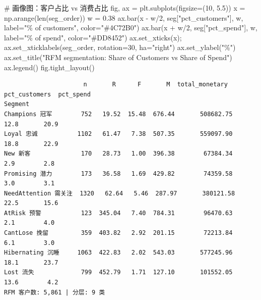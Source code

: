 \documentclass[
]{ctexart}
\newenvironment{Shaded}{\begin{snugshade}}{\end{snugshade}}
\newcommand{\BuiltInTok}[1]{\textcolor[rgb]{0.00,0.23,0.31}{#1}}
\newcommand{\CommentTok}[1]{\textcolor[rgb]{0.37,0.37,0.37}{#1}}
\newcommand{\DecValTok}[1]{\textcolor[rgb]{0.68,0.00,0.00}{#1}}
\newcommand{\FloatTok}[1]{\textcolor[rgb]{0.68,0.00,0.00}{#1}}
\newcommand{\NormalTok}[1]{\textcolor[rgb]{0.00,0.23,0.31}{#1}}
\newcommand{\OperatorTok}[1]{\textcolor[rgb]{0.37,0.37,0.37}{#1}}
\newcommand{\SpecialCharTok}[1]{\textcolor[rgb]{0.37,0.37,0.37}{#1}}
\newcommand{\StringTok}[1]{\textcolor[rgb]{0.13,0.47,0.30}{#1}}
\begin{document}
\begin{Shaded}
\begin{Highlighting}[]
\CommentTok{\# 画像图：客户占比 vs 消费占比}
\NormalTok{fig, ax }\OperatorTok{=}\NormalTok{ plt.subplots(figsize}\OperatorTok{=}\NormalTok{(}\DecValTok{10}\NormalTok{, }\FloatTok{5.5}\NormalTok{))}
\NormalTok{x }\OperatorTok{=}\NormalTok{ np.arange(}\BuiltInTok{len}\NormalTok{(seg\_order))}
\NormalTok{w }\OperatorTok{=} \FloatTok{0.38}
\NormalTok{ax.bar(x }\OperatorTok{{-}}\NormalTok{ w}\OperatorTok{/}\DecValTok{2}\NormalTok{, seg[}\StringTok{"pct\_customers"}\NormalTok{], w, label}\OperatorTok{=}\StringTok{"}\SpecialCharTok{\% o}\StringTok{f customers"}\NormalTok{, color}\OperatorTok{=}\StringTok{"\#4C72B0"}\NormalTok{)}
\NormalTok{ax.bar(x }\OperatorTok{+}\NormalTok{ w}\OperatorTok{/}\DecValTok{2}\NormalTok{, seg[}\StringTok{"pct\_spend"}\NormalTok{], w, label}\OperatorTok{=}\StringTok{"}\SpecialCharTok{\% o}\StringTok{f spend"}\NormalTok{, color}\OperatorTok{=}\StringTok{"\#DD8452"}\NormalTok{)}
\NormalTok{ax.set\_xticks(x)}\OperatorTok{;}\NormalTok{ ax.set\_xticklabels(seg\_order, rotation}\OperatorTok{=}\DecValTok{30}\NormalTok{, ha}\OperatorTok{=}\StringTok{"right"}\NormalTok{)}
\NormalTok{ax.set\_ylabel(}\StringTok{"\%"}\NormalTok{)}
\NormalTok{ax.set\_title(}\StringTok{"RFM segmentation: Share of Customers vs Share of Spend"}\NormalTok{)}
\NormalTok{ax.legend()}
\NormalTok{fig.tight\_layout()}
\end{Highlighting}
\end{Shaded}

\begin{verbatim}
                      n       R      F       M  total_monetary  pct_customers  pct_spend
Segment                                                                                 
Champions 冠军        752   19.52  15.48  676.44       508682.75           12.8       20.9
Loyal 忠诚           1102   61.47   7.38  507.35       559097.90           18.8       22.9
New 新客              170   28.73   1.00  396.38        67384.34            2.9        2.8
Promising 潜力        173   36.58   1.69  429.82        74359.58            3.0        3.1
NeedAttention 需关注  1320   62.64   5.46  287.97       380121.58           22.5       15.6
AtRisk 预警           123  345.04   7.40  784.31        96470.63            2.1        4.0
CantLose 挽留         359  403.82   2.92  201.15        72213.84            6.1        3.0
Hibernating 沉睡     1063  422.83   2.02  543.03       577245.96           18.1       23.7
Lost 流失             799  452.79   1.71  127.10       101552.05           13.6        4.2
RFM 客户数: 5,861 | 分层: 9 类
\end{verbatim}
\end{document}
